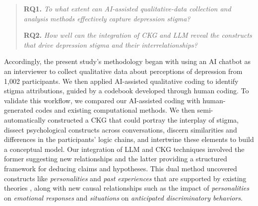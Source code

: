 

\begin{quote}
\textbf{RQ1.} \textit{To what extent can AI-assisted qualitative-data collection and analysis methods effectively capture depression stigma?}



\textbf{RQ2.} \textit{How well can the integration of CKG and LLM reveal the constructs that drive depression stigma and their interrelationships?}
\end{quote}

Accordingly, the present study's methodology began with using an AI chatbot as an interviewer to collect qualitative data about perceptions of depression from 1,002 participants.
We then applied AI-assisted qualitative coding to identify stigma attributions, guided by a codebook developed through human coding. 
To validate this workflow, we compared our AI-assisted coding with human-generated codes and existing computational methods. 
We then semi-automatically constructed a CKG that could portray the interplay of stigma, dissect psychological constructs across conversations, discern similarities and differences in the participants' logic chains, and intertwine these elements to build a conceptual model. 
Our integration of LLM and CKG techniques involved the former suggesting new relationships and the latter providing a structured framework for deducing claims and hypotheses. 
This dual method uncovered constructs like \textit{personalities} and \textit{past experiences} that are supported by existing theories \cite{personality_reviewer_steiger_2022, experience_weinstein_1989}, along with new causal relationships such as the impact of \textit{personalities} on \textit{emotional responses} and \textit{situations} on \textit{anticipated discriminatory behaviors}.


